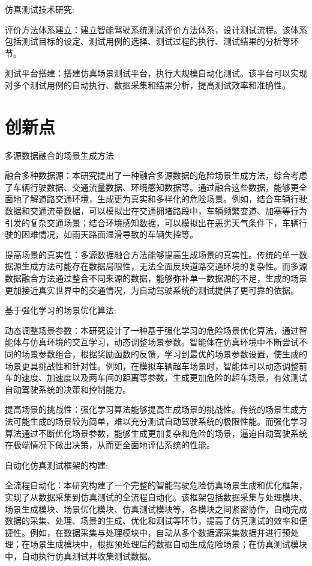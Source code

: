 仿真测试技术研究:

评价方法体系建立：建立智能驾驶系统测试评价方法体系，设计测试流程。该体系包括测试目标的设定、测试用例的选择、测试过程的执行、测试结果的分析等环节。

测试平台搭建：搭建仿真场景测试平台，执行大规模自动化测试。该平台可以实现对多个测试用例的自动执行、数据采集和结果分析，提高测试效率和准确性。



\section{创新点}

多源数据融合的场景生成方法

融合多种数据源：本研究提出了一种融合多源数据的危险场景生成方法，综合考虑了车辆行驶数据、交通流量数据、环境感知数据等。通过融合这些数据，能够更全面地了解道路交通环境，生成更为真实和多样化的危险场景。例如，结合车辆行驶数据和交通流量数据，可以模拟出在交通拥堵路段中，车辆频繁变道、加塞等行为引发的复杂交通场景；结合环境感知数据，可以模拟出在恶劣天气条件下，车辆行驶的困难情况，如雨天路面湿滑导致的车辆失控等。

提高场景的真实性：多源数据融合方法能够提高生成场景的真实性。传统的单一数据源生成方法可能存在数据局限性，无法全面反映道路交通环境的复杂性。而多源数据融合方法通过整合不同来源的数据，能够弥补单一数据源的不足，生成的场景更加接近真实世界中的交通情况，为自动驾驶系统的测试提供了更可靠的依据。

基于强化学习的场景优化算法:

动态调整场景参数：本研究设计了一种基于强化学习的危险场景优化算法，通过智能体与仿真环境的交互学习，动态调整场景参数。智能体在仿真环境中不断尝试不同的场景参数组合，根据奖励函数的反馈，学习到最优的场景参数设置，使生成的场景更具挑战性和针对性。例如，在模拟车辆超车场景时，智能体可以动态调整前车的速度、加速度以及两车间的距离等参数，生成更加危险的超车场景，有效测试自动驾驶系统的决策和控制能力。

提高场景的挑战性：强化学习算法能够提高生成场景的挑战性。传统的场景生成方法可能生成的场景较为简单，难以充分测试自动驾驶系统的极限性能。而强化学习算法通过不断优化场景参数，能够生成更加复杂和危险的场景，逼迫自动驾驶系统在极端情况下做出决策，从而更全面地评估系统的性能。

自动化仿真测试框架的构建:

全流程自动化：本研究构建了一个完整的智能驾驶危险仿真场景生成和优化框架，实现了从数据采集到仿真测试的全流程自动化。该框架包括数据采集与处理模块、场景生成模块、场景优化模块、仿真测试模块等，各模块之间紧密协作，自动完成数据的采集、处理、场景的生成、优化和测试等环节，提高了仿真测试的效率和便捷性。例如，在数据采集与处理模块中，自动从多个数据源采集数据并进行预处理；在场景生成模块中，根据预处理后的数据自动生成危险场景；在仿真测试模块中，自动执行仿真测试并收集测试数据。

